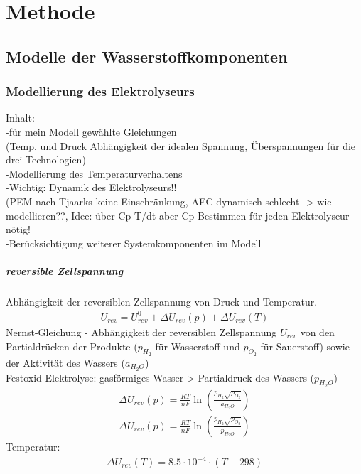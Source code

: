 \chapter{Methode}
\label{cha:Methode}

\section{Modelle der Wasserstoffkomponenten}

\subsection{Modellierung des Elektrolyseurs}
 Inhalt:\\
-für mein Modell gewählte Gleichungen\\
(Temp. und Druck Abhängigkeit der idealen Spannung, Überspannungen für die drei Technologien)\\ 
-Modellierung des Temperaturverhaltens\\
-Wichtig: Dynamik des Elektrolyseurs!!\\
(PEM nach Tjaarks keine Einschränkung, AEC dynamisch schlecht -> wie modellieren??, Idee: über Cp T/dt aber Cp Bestimmen für jeden Elektrolyseur nötig!\\ 
-Berücksichtigung weiterer Systemkomponenten im Modell


\paragraph{reversible Zellspannung}
Abhängigkeit der reversiblen Zellspannung von Druck und Temperatur.\\
\begin{align}
U_{rev} = U^0_{rev} + \Delta U_{rev}(p) + \Delta U_{rev}(T)
\end{align}
Nernst-Gleichung - Abhängigkeit der reversiblen Zellspannung $U_{rev}$ von den Partialdrücken der Produkte ($p_{H_2}$ für Wasserstoff und $p_{O_2}$ für Sauerstoff) sowie der Aktivität des Wassers ($a_{H_{2}O}$)\\
Festoxid Elektrolyse: gasförmiges Wasser-> Partialdruck des Wassers ($p_{H_{2}O}$) 
\begin{align}
 \Delta U_{rev}(p) = \frac{RT}{nF}\ln{(\frac{p_{H_2}\sqrt{p_{O_2}}}{a_{H_{2}O}})} \\ 
 \Delta U_{rev}(p) = \frac{RT}{nF}\ln{(\frac{p_{H_2}\sqrt{p_{O_2}}}{p_{H_{2}O}})}
\end{align}
Temperatur:\\
\begin{align}
	\Delta U_{rev}(T) = 8.5 \cdot 10^{-4} \cdot (T-298)
\end{align}

